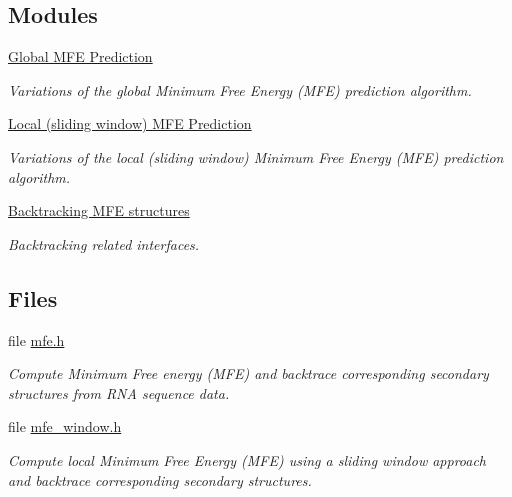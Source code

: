 \subsection*{Modules}
\begin{DoxyCompactItemize}
\item 
\hyperlink{group__mfe__global}{Global M\+F\+E Prediction}
\begin{DoxyCompactList}\small\item\em Variations of the global Minimum Free Energy (M\+FE) prediction algorithm. \end{DoxyCompactList}\item 
\hyperlink{group__mfe__window}{Local (sliding window) M\+F\+E Prediction}
\begin{DoxyCompactList}\small\item\em Variations of the local (sliding window) Minimum Free Energy (M\+FE) prediction algorithm. \end{DoxyCompactList}\item 
\hyperlink{group__mfe__backtracking}{Backtracking M\+F\+E structures}
\begin{DoxyCompactList}\small\item\em Backtracking related interfaces. \end{DoxyCompactList}\end{DoxyCompactItemize}
\subsection*{Files}
\begin{DoxyCompactItemize}
\item 
file \hyperlink{mfe_8h}{mfe.\+h}
\begin{DoxyCompactList}\small\item\em Compute Minimum Free energy (M\+FE) and backtrace corresponding secondary structures from R\+NA sequence data. \end{DoxyCompactList}\item 
file \hyperlink{mfe__window_8h}{mfe\+\_\+window.\+h}
\begin{DoxyCompactList}\small\item\em Compute local Minimum Free Energy (M\+FE) using a sliding window approach and backtrace corresponding secondary structures. \end{DoxyCompactList}\end{DoxyCompactItemize}
